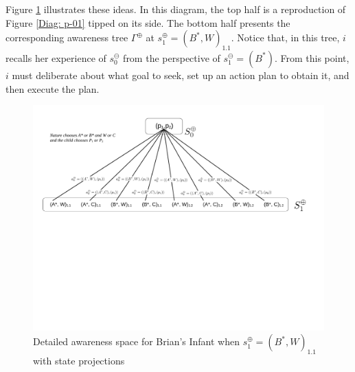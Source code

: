 \documentclass[
11pt,
titlepage,
reqno,
]{article}%
\theoremstyle{definition}
\begin{document}
Figure \ref{Diag: p-02} illustrates these ideas. In this diagram, the top half is a reproduction of Figure \ref{Diag: p-01} tipped on its side. 
The bottom half presents the corresponding awareness tree $\Gamma^\oplus$ at $s^\oplus_1=(B^\ast,W)_{1.1}$.
Notice that, in this tree, $i$ recalls her experience of $s^\ominus_0$ from the perspective of $s^\ominus_1=(B^\ast)$.
From this point, $i$ must deliberate about what goal to seek, set up an action plan to obtain it, and then execute the plan.

\begin{figure}[h!]
	\centering
	\includegraphics*[page=2,trim = 0in 1in 0in 0in,scale=.6]{Awareness_Diagrams_All}
	\caption{Detailed awareness space for Brian's Infant when $s^\oplus_1=(B^\ast,W)_{1.1}$ with state projections\label{Diag: p-02}}%
\end{figure}
\end{document}

